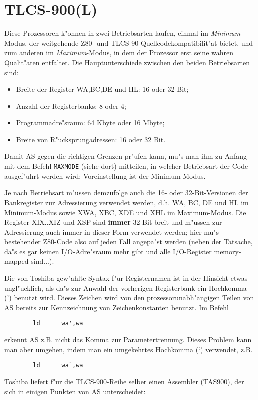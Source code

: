 \documentclass[12pt,a4paper,twoside]{report}
\newcommand{\ii}[1]{{\it #1}}
\newcommand{\bb}[1]{{\bf #1}}
\newcommand{\tty}[1]{{\tt #1}}
\begin{document}
{%

\section{TLCS-900(L)}
\label{TLCS900Spec}

Diese Prozessoren k"onnen in zwei Betriebsarten laufen, einmal im
\ii{Minimum}-Modus, der weitgehende Z80- und TLCS-90-Quellcodekompatibilit"at
bietet, und zum anderen im \ii{Maximum}-Modus, in dem der Prozessor
erst seine wahren Qualit"aten entfaltet.  Die Hauptunterschiede zwischen
den beiden Betriebsarten sind:
\begin{itemize}
\item{Breite der Register WA,BC,DE und HL: 16 oder 32 Bit;}
\item{Anzahl der Registerbanks: 8 oder 4;}
\item{Programmadre"sraum: 64 Kbyte oder 16 Mbyte;}
\item{Breite von R"ucksprungadressen: 16 oder 32 Bit.}
\end{itemize}
Damit AS gegen die richtigen Grenzen pr"ufen kann, mu"s man ihm zu Anfang
mit dem Befehl \tty{MAXMODE} (siehe dort) mitteilen, in welcher Betriebsart
der Code ausgef"uhrt werden wird; Voreinstellung ist der Minimum-Modus.
\par
Je nach Betriebsart m"ussen demzufolge auch die 16- oder 32-Bit-Versionen
der Bankregister zur Adressierung verwendet werden, d.h. WA, BC, DE und HL
im Minimum-Modus sowie XWA, XBC, XDE und XHL im Maximum-Modus.  Die Register
XIX..XIZ und XSP sind \bb{immer} 32 Bit breit und m"ussen zur Adressierung
auch immer in dieser Form verwendet werden; hier mu"s bestehender Z80-Code
also auf jeden Fall angepa"st werden (neben der Tatsache, da"s es gar keinen
I/O-Adre"sraum mehr gibt und alle I/O-Register memory-mapped sind...).
\par
Die von Toshiba gew"ahlte Syntax f"ur Registernamen ist in der Hinsicht
etwas ungl"ucklich, als da"s zur Anwahl der vorherigen Registerbank ein
Hochkomma (') benutzt wird.
Dieses Zeichen wird von den prozessorunabh"angigen Teilen von AS bereits zur
Kennzeichnung von Zeichenkonstanten benutzt.  Im Befehl
\begin{verbatim}
        ld      wa',wa
\end{verbatim}
erkennt AS z.B. nicht das Komma zur Parametertrennung.
Dieses Problem kann man aber umgehen,
indem man ein umgekehrtes Hochkomma (`) verwendet, z.B.
\begin{verbatim}
        ld      wa`,wa
\end{verbatim}
Toshiba liefert f"ur die TLCS-900-Reihe selber einen Assembler (TAS900), der
sich in einigen Punkten von AS unterscheidet:

}
\end{document}
